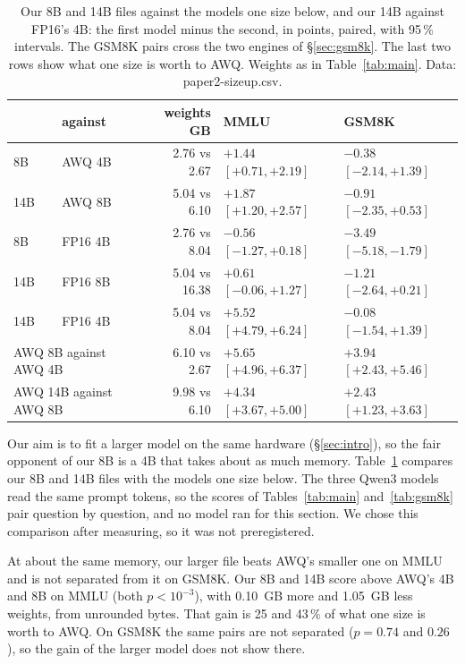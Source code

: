 \begin{table}[t]
\centering\small\setlength{\tabcolsep}{4pt}
\caption{Our 8B and 14B files against the models one size below, and our 14B
against FP16's 4B: the first model minus the second, in points, paired, with
95\,\% intervals. The GSM8K pairs cross the two engines of
\S\ref{sec:gsm8k}. The last two rows show
what one size is worth to AWQ. Weights as in Table~\ref{tab:main}. Data:
paper2-sizeup.csv.}
\label{tab:sizeup}
\begin{tabular}{llrll}
\toprule
\Tetra{} & against & weights GB & MMLU & GSM8K\\
\midrule
8B & AWQ 4B & 2.76 vs 2.67 & $+1.44$ $[+0.71, +2.19]$ & $-0.38$ $[-2.14, +1.39]$\\
14B & AWQ 8B & 5.04 vs 6.10 & $+1.87$ $[+1.20, +2.57]$ & $-0.91$ $[-2.35, +0.53]$\\
8B & FP16 4B & 2.76 vs 8.04 & $-0.56$ $[-1.27, +0.18]$ & $-3.49$ $[-5.18, -1.79]$\\
14B & FP16 8B & 5.04 vs 16.38 & $+0.61$ $[-0.06, +1.27]$ & $-1.21$ $[-2.64, +0.21]$\\
14B & FP16 4B & 5.04 vs 8.04 & $+5.52$ $[+4.79, +6.24]$ & $-0.08$ $[-1.54, +1.39]$\\
\midrule
\multicolumn{2}{l}{AWQ 8B against AWQ 4B} & 6.10 vs 2.67 & $+5.65$ $[+4.96, +6.37]$ & $+3.94$ $[+2.43, +5.46]$\\
\multicolumn{2}{l}{AWQ 14B against AWQ 8B} & 9.98 vs 6.10 & $+4.34$ $[+3.67, +5.00]$ & $+2.43$ $[+1.23, +3.63]$\\
\bottomrule
\end{tabular}
\end{table}

Our aim is to fit a larger model on the same hardware (\S\ref{sec:intro}), so
the fair opponent of our 8B is a 4B that takes about as much memory.
Table~\ref{tab:sizeup} compares our 8B and 14B files with the models one size
below. The three Qwen3 models read the same prompt tokens, so the scores of
Tables~\ref{tab:main} and~\ref{tab:gsm8k} pair question by question, and no
model ran for this section. We chose this comparison after measuring, so it
was not preregistered.

At about the same memory, our larger file beats AWQ's smaller one on MMLU and
is not separated from it on GSM8K. Our 8B and 14B score above AWQ's 4B and 8B
on MMLU (both $p<10^{-3}$), with 0.10~GB more and 1.05~GB less weights, from
unrounded bytes. That gain is 25 and 43\,\% of what one size is worth to AWQ.
On GSM8K the same pairs are not separated ($p=0.74$ and $0.26$), so the gain
of the larger model does not show there.

